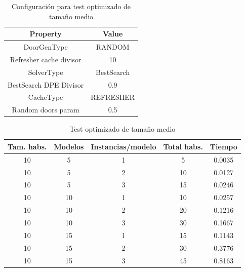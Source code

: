 \begin{table}[H]
\begin{center}
	\begin{tabular}{ | c | c | }
\hline
 		Property & Value \\ \hline
DoorGenType & RANDOM \\ 
Refresher cache divisor & 10 \\ 
SolverType & BestSearch \\ 
BestSearch DPE Divisor & 0.9 \\ 
CacheType & REFRESHER \\ 
Random doors param & 0.5 \\ 
\hline
	\end{tabular}
\end{center}
\caption{Configuración para test optimizado de tamaño medio}
\label{table:cfg-bsoptmedsamp}
\end{table}

\begin{table}[H]
\begin{center}
	\begin{tabular}{ | c | c | c | c | c | }
\hline
Tam. habs. & Modelos & Instancias/modelo & Total habs. & Tiempo \\ \hline 
10 & 5 & 1 & 5 & 0.0035 \\ 
10 & 5 & 2 & 10 & 0.0127 \\ 
10 & 5 & 3 & 15 & 0.0246 \\ 
10 & 10 & 1 & 10 & 0.0257 \\ 
10 & 10 & 2 & 20 & 0.1216 \\ 
10 & 10 & 3 & 30 & 0.1667 \\ 
10 & 15 & 1 & 15 & 0.1143 \\ 
10 & 15 & 2 & 30 & 0.3776 \\ 
10 & 15 & 3 & 45 & 0.8163 \\ 
\hline
	\end{tabular}
\end{center}
\caption{Test optimizado de tamaño medio}
\label{table:bsoptmedsamp}
\end{table}


